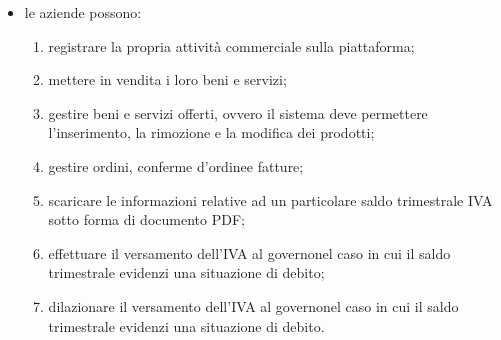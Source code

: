 \begin{itemize}
\begin{enumerate}[label=\alph*.]
		\begin{itemize}
			\item \textbf{deposito dei beni}: il cliente, durante il procedimento di 
				acquisto, versa la somma dovuta nella piattaforma, dove verrà momentaneamente 
				trattenuta. Il cliente riceve una conferma d'ordine\glosp nella sezione apposita 
				del proprio account, e l'ordine viene aggiunto alle vendite in attesa di 
				conferma nella sezione apposita dell'account dell'azienda-venditrice. La vera 
				fattura conterrà gli stessi dati della conferma d'ordine\glo, ma verrà compilata 
				all'approvazione di quest'ultima, per poter riportare la data corretta. La 
				compilazione sarà eseguita dal sistema, che sta agendo da garante nel meccanismo 
				di escrow\glo, ed è attualmente in possesso di entrambi gli oggetti della 
				transazione/scambio;
			\item \textbf{riscatto beni}: all'approvazione, esplicita o automatica, della 
				conferma d'ordine\glosp da parte del cliente, esso riceve la fattura, mentre 
				l'azienda-venditrice riceve l'ammontare trattenuto dal sistema e può accedere 
				alla fattura a sua volta.
		\end{itemize}
	Questo sistema è atto a garantire che ad ogni ordine il cliente riceva la 
	fattura per dimostrare l'acquisto effettuato, e che l'azienda-venditrice riceva 
	il pagamento. Con l'adozione di tale meccanismo viene semplificata la gestione 
	dell'IVA, in quanto tutte le fatture emesse sono state approvate, e quindi da 
	considerarsi prive di errori. 
	\end{enumerate}
	\item le aziende possono:
	\begin{enumerate}[label=\alph*.]
		\item registrare la propria attività commerciale sulla piattaforma;
		\item mettere in vendita i loro beni e servizi;
		\item gestire beni e servizi offerti, ovvero il sistema deve permettere 
			l'inserimento, la rimozione e la modifica dei prodotti;
		\item gestire ordini, conferme d'ordine\glosp e fatture;	
		\item scaricare le informazioni relative ad un particolare saldo trimestrale 
			IVA  sotto forma di documento PDF;
		\item effettuare il versamento dell'IVA al governo\glosp nel caso in cui il 
			saldo trimestrale evidenzi una situazione di debito;
		\item dilazionare il versamento dell'IVA al governo\glosp nel caso in cui il 
			saldo trimestrale evidenzi una situazione di debito.
	\end{enumerate}

\end{itemize}
